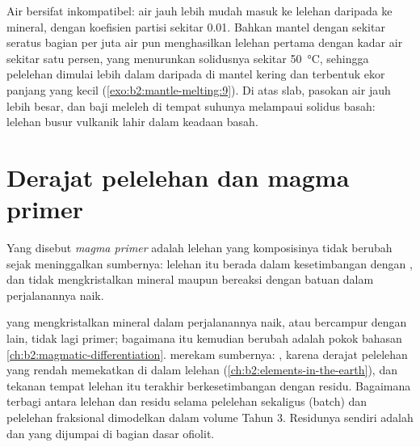 Air bersifat inkompatibel: air jauh lebih mudah masuk ke lelehan daripada ke mineral,
dengan koefisien partisi sekitar 0.01. Bahkan mantel dengan sekitar seratus
bagian per juta air pun menghasilkan lelehan pertama dengan kadar air sekitar satu persen,
yang menurunkan solidusnya sekitar \qty{50}{\celsius}, sehingga pelelehan
dimulai lebih dalam daripada di mantel kering dan terbentuk ekor panjang  yang kecil
(\cref{exo:b2:mantle-melting:9}). Di atas slab, pasokan air jauh lebih besar, dan baji meleleh
di tempat suhunya melampaui solidus basah: lelehan busur vulkanik lahir
dalam keadaan basah.

\section{Derajat pelelehan dan magma primer}\label{sec:b2:mantle-melting:primary}

\begin{definition}\label{def:b2:mantle-melting:primary}
Yang disebut \emph{magma primer} adalah lelehan yang komposisinya tidak
berubah sejak meninggalkan sumbernya: lelehan itu berada dalam kesetimbangan dengan ,
dan tidak mengkristalkan mineral maupun bereaksi dengan batuan dalam perjalanannya naik.
\end{definition}

 yang mengkristalkan mineral dalam perjalanannya naik, atau bercampur dengan  lain, tidak
lagi primer; bagaimana  itu kemudian berubah adalah pokok bahasan
\cref{ch:b2:magmatic-differentiation}.  merekam sumbernya: , karena derajat pelelehan yang rendah memekatkan 
di dalam lelehan (\cref{ch:b2:elements-in-the-earth}), dan tekanan tempat lelehan itu terakhir
berkesetimbangan dengan residu. Bagaimana  terbagi antara lelehan dan
residu selama pelelehan sekaligus (batch) dan pelelehan fraksional dimodelkan dalam volume Tahun 3. Residunya
sendiri adalah  dan  yang dijumpai di bagian dasar
ofiolit.


